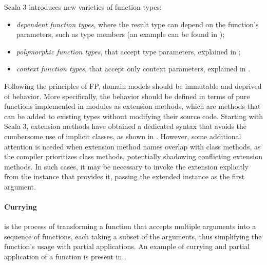 Scala 3 introduces new varieties of function types:
\begin{itemize}
    \item \textit{dependent function types}, where the result type can depend on the function's parameters, such as type members (an example can be found in );
    \item \textit{polymorphic function types}, that accept type parameters, explained in ;
    \item \textit{context function types}, that accept only context parameters, explained in .
\end{itemize}

Following the principles of \ac{FP}, domain models should be immutable and deprived of behavior.
%
More specifically, the behavior should be defined in terms of pure functions implemented in modules as extension methods, which are methods that can be added to existing types without modifying their source code.
%
Starting with Scala 3, extension methods have obtained a dedicated syntax that avoids the cumbersome use of implicit classes, as shown in .
%
However, some additional attention is needed when extension method names overlap with class methods, as the compiler prioritizes class methods, potentially shadowing conflicting extension methods.
%
In such cases, it may be necessary to invoke the extension explicitly from the instance that provides it, passing the extended instance as the first argument.



\paragraph{Currying} is the process of transforming a function that accepts multiple arguments into a sequence of functions, each taking a subset of the arguments, thus simplifying the function's usage with partial applications.
%
An example of currying and partial application of a function is present in .





